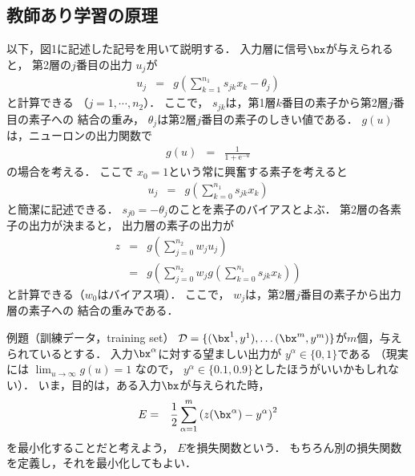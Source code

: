 \documentclass[a4paper,11pt]{jarticle}
\begin{document}
\subsection{教師あり学習の原理}
以下，図1に記述した記号を用いて説明する．
入力層に信号$\bx$が与えられると，
第2層の$j$番目の出力 $u_j$が
\begin{eqnarray}
u_j & = & g \left ( \sum_{k=1}^{n_1} s_{jk}x_k - \theta_j \right )
\end{eqnarray}
と計算できる
（$j=1,\cdots,n_2$）．
ここで，
$s_{jk}$は，第1層$k$番目の素子から第2層$j$番目の素子への
結合の重み，
$\theta_j$は第2層$j$番目の素子のしきい値である．
$g(u)$は，ニューロンの出力関数で
\begin{eqnarray}
g(u) & = & \frac{1}{1 + \text{e}^{-u} } 
\end{eqnarray}
の場合を考える．
ここで $x_0=1$という常に興奮する素子を考えると
\begin{eqnarray}
u_j & = & g \left ( \sum_{k=0}^{n_1} s_{jk}x_k \right )
\end{eqnarray}
と簡潔に記述できる．
$s_{j0} = -\theta_j$のことを素子のバイアスとよぶ．
%
第2層の各素子の出力が決まると，
出力層の素子の出力が
\begin{eqnarray}
 z & = & g \left ( \sum_{j=0}^{n_2} w_j u_j \right ) \\
 & = & g \left ( \sum_{j=0}^{n_2} w_j g \left ( \sum_{k=0}^{n_1} s_{jk}x_k \right ) \right ) 
 \end{eqnarray}
と計算できる（$w_0$はバイアス項）．
ここで，
$w_j$は，第2層$j$番目の素子から出力層の素子への
結合の重みである．


例題（訓練データ，training set）
${\cal D} = \{
      (\bx^1, y^1), \dots
      (\bx^m, y^m)
      \}
      $が$m$個，与えられているとする．
      入力$\bx^\alpha$に対する望ましい出力が
      $y^\alpha \in \{0,1\}$である
      （現実には $ \lim_{u \rightarrow \infty} g(u)= 1$ なので，
      $y^\alpha \in \{0.1,0.9\}$としたほうがいいかもしれない）．
いま，目的は，ある入力$\bx$が与えられた時，
\begin{eqnarray}
E & = & \frac{1}{2} 
\sum_{\alpha=1}^{m} 
\left ( z(\bx^\alpha) - y^\alpha \right )^2
\end{eqnarray}
を最小化することだと考えよう，
$E$を損失関数という．
もちろん別の損失関数を定義し，それを最小化してもよい．
\end{document}
